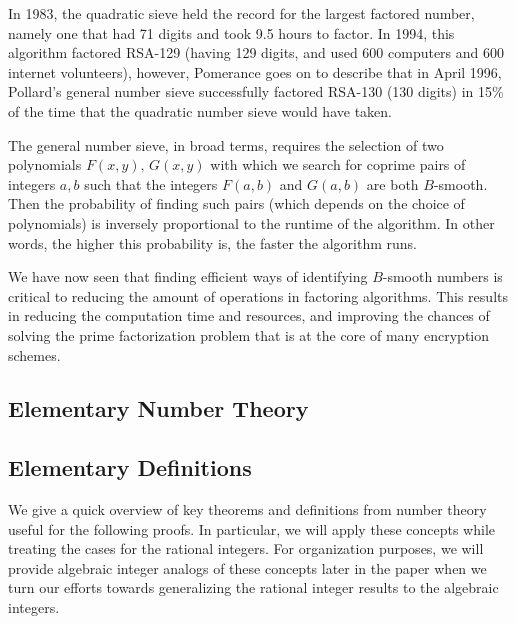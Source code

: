 \documentclass[12pt]{amsart}
\theoremstyle{definition}
\begin{document}
In 1983, the quadratic sieve held the record for the largest factored number, namely one that had 71 digits and took 9.5 hours to factor. In 1994, this algorithm factored RSA-129 (having 129 digits, and used 600 computers and 600 internet volunteers), however, Pomerance goes on to describe that in April 1996, Pollard's general number sieve successfully factored RSA-130 (130 digits) in 15\% of the time that the quadratic number sieve would have taken. 

The general number sieve, in broad terms, requires the selection of two polynomials $F(x,y), \, G(x,y)$ with which we search for coprime pairs of integers $a,b$ such that the integers $F(a,b)$ and $G(a,b)$ are both $B$-smooth. Then the probability of finding such pairs (which depends on the choice of polynomials) is inversely proportional to the runtime of the algorithm. In other words, the higher this probability is, the faster the algorithm runs.

We have now seen that finding efficient ways of identifying $B$-smooth numbers is critical to reducing the amount of operations in factoring algorithms. This results in reducing the computation time and resources, and improving the chances of solving the prime factorization problem that is at the core of many encryption schemes.




\subsection{Elementary Number Theory}


\subsection{Elementary Definitions}

We give a quick overview of key theorems and definitions from number theory useful for the following proofs. In particular, we will apply these concepts while treating the cases for the rational integers. For organization purposes, we will provide algebraic integer analogs of these concepts later in the paper when we turn our efforts towards generalizing the rational integer results to the algebraic integers.
\end{document}
